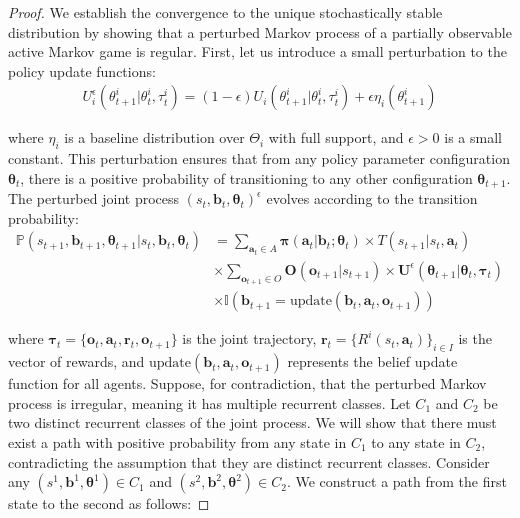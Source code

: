 \documentclass[a4paper,12pt]{report}
\begin{document}
\begin{proof}
    We establish the convergence to the unique stochastically stable distribution by
    showing that a perturbed Markov process of a partially observable active Markov
    game is regular. First, let us introduce a small perturbation to the policy update
    functions:
    \begin{align}
        U^{\epsilon}_{i}(\theta^{i}_{t+1}|\theta^{i}_{t}, \tau^{i}_{t}) = (1 - \epsilon) U_{i}(\theta^{i}_{t+1}|\theta^{i}_{t}, \tau^{i}_{t}) + \epsilon \eta_{i}(\theta^{i}_{t+1})
    \end{align}

    where $\eta_{i}$ is a baseline distribution over $\Theta_{i}$ with full support,
    and $\epsilon > 0$ is a small constant. This perturbation ensures that from any
    policy parameter configuration $\boldsymbol{\theta}_{t}$, there is a positive
    probability of transitioning to any other configuration
    $\boldsymbol{\theta}_{t+1}$. The perturbed joint process $(s_{t}, \boldsymbol{b}
        _{t}, \boldsymbol{\theta}_{t})^{\epsilon}$ evolves according to the transition
    probability:
    \begin{align}
        \mathbb{P}(s_{t+1}, \boldsymbol{b}_{t+1}, \boldsymbol{\theta}_{t+1}|s_{t}, \boldsymbol{b}_{t}, \boldsymbol{\theta}_{t}) & = \sum_{\boldsymbol{a}_t \in A}\boldsymbol{\pi}(\boldsymbol{a}_{t}|\boldsymbol{b}_{t}; \boldsymbol{\theta}_{t}) \times T(s_{t+1}|s_{t}, \boldsymbol{a}_{t})                                     \\
                                                                                                                                & \times \sum_{\boldsymbol{o}_{t+1} \in O}\boldsymbol{O}(\boldsymbol{o}_{t+1}|s_{t+1}) \times \boldsymbol{U}^{\epsilon}(\boldsymbol{\theta}_{t+1}|\boldsymbol{\theta}_{t}, \boldsymbol{\tau}_{t}) \\
                                                                                                                                & \times \mathbb{I}(\boldsymbol{b}_{t+1}= \text{update}(\boldsymbol{b}_{t}, \boldsymbol{a}_{t}, \boldsymbol{o}_{t+1}))
    \end{align}

    where $\boldsymbol{\tau}_{t} = \{\boldsymbol{o}_{t}, \boldsymbol{a}_{t}, \boldsymbol
        {r}_{t}, \boldsymbol{o}_{t+1}\}$ is the joint trajectory,
    $\boldsymbol{r}_{t} = \{R^{i}(s_{t}, \boldsymbol{a}_{t})\}_{i \in I}$ is the
    vector of rewards, and $\text{update}(\boldsymbol{b}_{t}, \boldsymbol{a}_{t}, \boldsymbol
        {o}_{t+1})$ represents the belief update function for all agents. Suppose, for
    contradiction, that the perturbed Markov process is irregular, meaning it has multiple
    recurrent classes. Let $C_{1}$ and $C_{2}$ be two distinct recurrent classes
    of the joint process. We will show that there must exist a path with positive probability
    from any state in $C_{1}$ to any state in $C_{2}$, contradicting the
    assumption that they are distinct recurrent classes. Consider any $(s^{1}, \boldsymbol
        {b}^{1}, \boldsymbol{\theta}^{1}) \in C_{1}$ and $(s^{2}, \boldsymbol{b}^{2}, \boldsymbol
        {\theta}^{2}) \in C_{2}$. We construct a path from the first state to the
    second as follows:


\end{proof}
\end{document}
